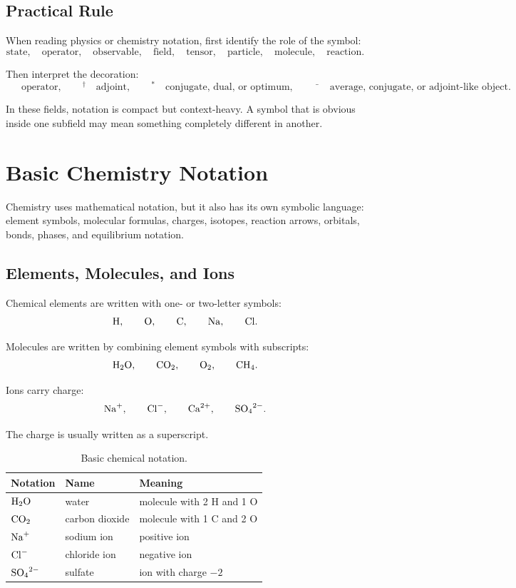 \documentclass[11pt,twocolumn]{article}
\begin{document}
\subsection{Practical Rule}

When reading physics or chemistry notation, first identify the role of the
symbol:
\[
\text{state},
\quad
\text{operator},
\quad
\text{observable},
\quad
\text{field},
\quad
\text{tensor},
\quad
\text{particle},
\quad
\text{molecule},
\quad
\text{reaction}.
\]

Then interpret the decoration:
\[
\hat{\phantom{x}}
\quad
\text{operator},
\qquad
{}^\dagger
\quad
\text{adjoint},
\qquad
{}^*
\quad
\text{conjugate, dual, or optimum},
\qquad
\bar{\phantom{x}}
\quad
\text{average, conjugate, or adjoint-like object}.
\]

In these fields, notation is compact but context-heavy. A symbol that is obvious
inside one subfield may mean something completely different in another.

\section{Basic Chemistry Notation}

Chemistry uses mathematical notation, but it also has its own symbolic language:
element symbols, molecular formulas, charges, isotopes, reaction arrows,
orbitals, bonds, phases, and equilibrium notation.

\subsection{Elements, Molecules, and Ions}

Chemical elements are written with one- or two-letter symbols:
\[
\ce{H},
\qquad
\ce{O},
\qquad
\ce{C},
\qquad
\ce{Na},
\qquad
\ce{Cl}.
\]

Molecules are written by combining element symbols with subscripts:
\[
\ce{H2O},
\qquad
\ce{CO2},
\qquad
\ce{O2},
\qquad
\ce{CH4}.
\]

Ions carry charge:
\[
\ce{Na+},
\qquad
\ce{Cl-},
\qquad
\ce{Ca^2+},
\qquad
\ce{SO4^2-}.
\]

The charge is usually written as a superscript.

\begin{table}[ht]
\centering
\small
\caption{Basic chemical notation.}
\begin{tabular}{lll}
\toprule
Notation & Name & Meaning \\
\midrule
$\ce{H2O}$ & water & molecule with 2 H and 1 O \\
$\ce{CO2}$ & carbon dioxide & molecule with 1 C and 2 O \\
$\ce{Na+}$ & sodium ion & positive ion \\
$\ce{Cl-}$ & chloride ion & negative ion \\
$\ce{SO4^2-}$ & sulfate & ion with charge \(-2\) \\
\bottomrule
\end{tabular}
\end{table}
\end{document}

